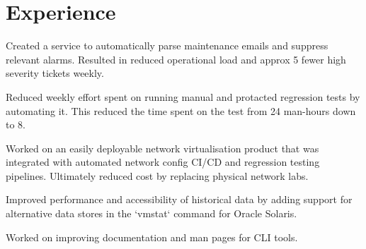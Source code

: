\documentclass[]{resume}
\begin{document}
\begin{minipage}[t]{0.70\textwidth}

\section{Experience}

\vspace{2pt}
\vspace{10pt}
\begin{tightemize}
\item  Created a service to automatically parse maintenance emails and suppress
relevant alarms. Resulted in reduced operational load and approx 5 fewer high
severity tickets weekly.
\item Reduced weekly effort spent on running manual and protacted regression tests by automating it.
This reduced the time spent on the test from 24 man-hours down to 8.
\item Worked on an easily deployable network virtualisation product that was integrated with
automated network config CI/CD and regression testing pipelines. Ultimately reduced cost by
replacing physical network labs.
\end{tightemize}
\subsectionsep

\vspace{2pt}
\vspace{1pt}
\begin{tightemize}
\item Improved performance and accessibility of historical data by adding support for
alternative data stores in the `vmstat` command for Oracle Solaris.
\item Worked on improving documentation and man pages for CLI tools.
\end{tightemize}
\subsectionsep  %


\end{minipage}
\end{document}
